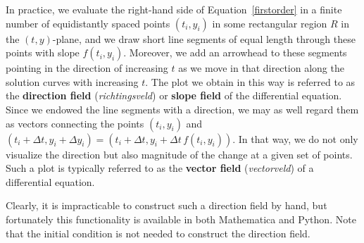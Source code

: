 In practice, we evaluate the right-hand side of Equation~\eqref{firstorder} in a finite number of equidistantly spaced points $\left(t_i,y_i\right)$ in some rectangular region $R$ in the $(t,y)$-plane, and we draw short line segments of equal length through these points with slope $f\left(t_i,y_i\right)$. Moreover, we add an arrowhead to these segments pointing in the direction of increasing $t$ as we move in that direction along the solution curves with increasing $t$. The plot we obtain in this way is referred to as the \textbf{direction field} (\textit{richtingsveld}) or \textbf{slope field} of the differential equation. Since we endowed the line segments with a direction, we may as well regard them as vectors connecting the points $\left(t_i,y_i\right)$ and $\left(t_i+\Delta t,y_i+\Delta y_i\right) = \left(t_i+\Delta t,y_i+\Delta t\,f\left(t_i,y_i\right)\right)$. In that way, we do not only visualize the direction but also magnitude of the change at a given set of points. Such a plot is typically referred to as the \textbf{vector field} (\textit{vectorveld}) of a differential equation.  

Clearly, it is impracticable to construct such a direction field by hand, but fortunately this functionality is available in both Mathematica and Python. Note that the initial condition is not needed to construct the direction field. 

